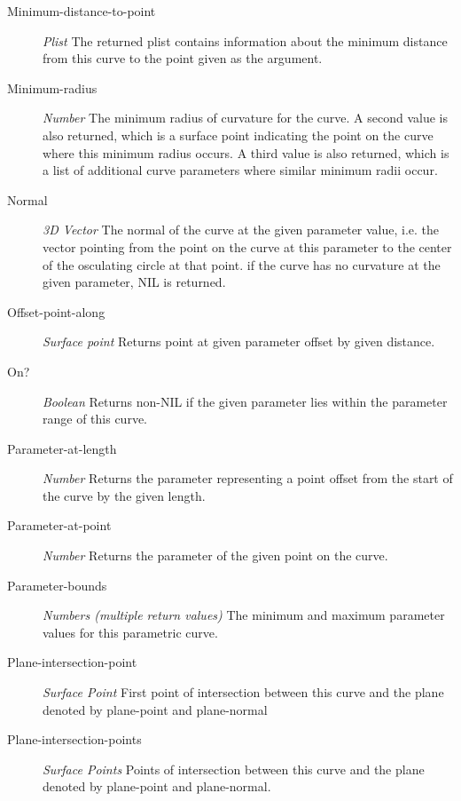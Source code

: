 \documentclass [11pt]{book}
\begin{document}
\begin{itemize}
\begin{description}
\item [Minimum-distance-to-point]
\emph{Plist} The returned plist contains information about the minimum distance from this curve to the point given as the argument.


\item [Minimum-radius]
\emph{Number} The minimum radius of curvature for the curve. A second value is also returned, which is a surface point indicating
the point on the curve where this minimum radius occurs. A third value is also returned, which is a list of additional curve
parameters where similar minimum radii occur.


\item [Normal]
\emph{3D Vector} The normal of the curve at the given parameter value, i.e. the vector pointing from the point
on the curve at this parameter to the center of the osculating circle at that point. if the curve has no
curvature at the given parameter, NIL is returned.


\item [Offset-point-along]
\emph{Surface point} Returns point at given parameter offset by given distance.


\item [On?]
\emph{Boolean} Returns non-NIL if the given parameter lies within the parameter range of this curve.


\item [Parameter-at-length]
\emph{Number} Returns the parameter representing a point offset from the start of the curve by the given length.


\item [Parameter-at-point]
\emph{Number} Returns the parameter of the given point on the curve.


\item [Parameter-bounds]
\emph{Numbers (multiple return values)} The minimum and maximum parameter values for this parametric curve.


\item [Plane-intersection-point]
\emph{Surface Point}  First point of intersection between this curve and the plane denoted by plane-point and plane-normal


\item [Plane-intersection-points]
\emph{Surface Points}  Points of intersection between this curve and the plane denoted by plane-point and plane-normal.



\end{description}
\end{itemize}
\end{document}
